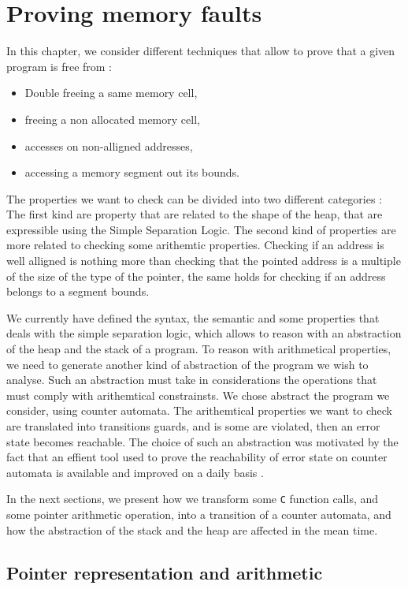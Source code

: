 \documentclass[a4paper,twoside,12pt]{report}
\begin{document}
\chapter{Proving memory faults}
In this chapter, we consider different techniques that allow to prove that
a given program is free from :

\begin{itemize}
\item  Double freeing  a same memory cell,
\item freeing a non allocated memory cell,
\item accesses on non-alligned addresses,
\item accessing a memory segment out its bounds. 
\end{itemize}


The properties we want to check can be divided into two different categories : The first kind are property that are related to the shape of the heap, that are expressible using the Simple Separation Logic. The second kind of properties are more
related to checking some arithemtic properties. Checking if an address is well alligned is nothing more than checking that the pointed address is a multiple of the
size of the type of the pointer, the same holds for checking if an address belongs
to a segment bounds. 

We currently have defined the syntax, the semantic and some properties that
deals with the simple separation logic, which allows to reason with an
abstraction of the heap and the stack of a program. To reason with arithmetical
properties, we need to generate another kind of abstraction of the program we
wish to analyse. Such an abstraction must take in considerations the operations that must comply with arithemtical constrainsts. We chose abstract the program we consider, using counter automata. The arithemtical properties we want to check are translated into transitions guards, and is some are violated, then an error state 
becomes reachable. The choice of such an abstraction was motivated by the fact
that an effient tool used to prove the reachability of error state on counter
automata is available and improved on a daily basis \cite{Bozga06flata}. 

In the next sections, we present how we transform some \lstinline!C! function
calls, and some pointer arithmetic operation, into a transition of a counter
automata, and how the abstraction of the stack and the heap are affected in
the mean time.


\section{Pointer representation and arithmetic}
\end{document}
